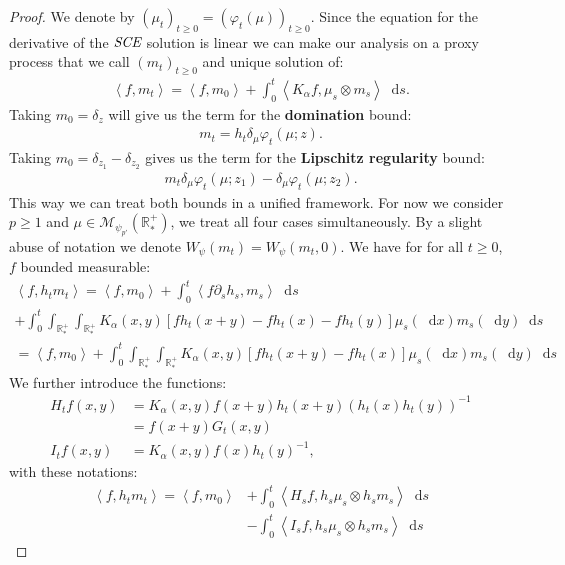 \documentclass[11pt,a4paper]{article}
\newcommand{\RRP}{\mathbb{R}^+_*}
\newcommand{\MC}{\mathcal{M}}
\newcommand{\SCE}{\emph{SCE}}
\newcommand{\Proc}[1]{\left(#1\right)_{t\geq 0}}
\newcommand{\brac}[1]{\left\langle#1\right\rangle}
\newcommand{\dd}{\mathop{}\!\mathrm{d}}
\begin{document}
\begin{proof}
    We denote by $\Proc{\mu_t} = \Proc{\varphi_t(\mu)}$. Since the equation for the derivative of the $\SCE$  solution is linear we can make our analysis on a proxy process that we call $\Proc{m_t}$ and unique solution of:
    \begin{align*}
        \brac{f,m_t} = \brac{f,m_0} + \int_0^t \brac{K_\alpha f,\mu_s\otimes m_s} \dd s.
    \end{align*}
    Taking $m_0 = \delta_z$ will give us the term for the \textbf{domination} bound:
    \begin{align*}
        m_t = h_t\delta_\mu \varphi_t(\mu;z).
    \end{align*}
    Taking $m_0 = \delta_{z_1} - \delta_{z_2}$ gives us the term for the \textbf{Lipschitz regularity} bound: 
    \begin{align*}
        m_t \delta_\mu \varphi_t(\mu;z_1) - \delta_\mu \varphi_t(\mu;z_2).
    \end{align*}
    This way we can treat both bounds in a unified framework. For now we consider $p \geq 1$ and $\mu \in \MC_{\psi_{p'}}(\RRP)$, we treat all four cases simultaneously.
    By a slight abuse of notation we denote $W_{\psi}(m_t) = W_{\psi}(m_t,0)$. We have for for all $t\geq 0$, $f$ bounded measurable:
    \begin{multline*}
        \brac{f,h_tm_t} = \brac{f,m_0} + \int_0^t \brac{f \partial_s h_s,m_s} \dd s \\
        + \int_0^t \int_{\RRP}\int_{\RRP}K_\alpha(x,y) \left[fh_t(x+y) - fh_t(x) - fh_t(y) \right] \mu_s(\dd x) m_s(\dd y) \dd s \\
        = \brac{f,m_0} + \int_0^t \int_{\RRP}\int_{\RRP}K_\alpha(x,y) \left[fh_t(x+y) - fh_t(x)\right] \mu_s(\dd x) m_s(\dd y) \dd s
    \end{multline*}
    We further introduce the functions:
    \begin{align*}
        H_tf(x,y) &= K_\alpha(x,y) f(x+y) h_t(x+y)\left(h_t(x)h_t(y)\right)^{-1} \\
        &= f(x+y) G_t(x,y)\\
        I_tf(x,y) &= K_\alpha(x,y)f(x) h_t(y)^{-1},
    \end{align*}
    with these notations:
    \begin{subequations}
    \begin{align}
        \brac{f,h_tm_t} = \brac{f,m_0} &+ \int_0^t \brac{H_sf,h_s\mu_s \otimes h_s m_s} \dd s\label{proof:eq:wass-rescaled-SCE-1}\\
        &-\int_0^t \brac{I_sf,h_s\mu_s \otimes h_s m_s} \dd s\label{proof:eq:wass-rescaled-SCE-2}
    \end{align}
    \label{proof:eq:wass-rescaled-SCE}
    \end{subequations}


\end{proof}
\end{document}
